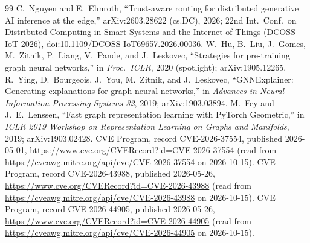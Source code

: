 \begin{thebibliography}{99}
 C.~Nguyen and E.~Elmroth, ``Trust-aware routing for distributed generative AI inference at the edge,'' arXiv:2603.28622 (cs.DC), 2026; 22nd Int.\ Conf.\ on Distributed Computing in Smart Systems and the Internet of Things (DCOSS-IoT 2026), doi:10.1109/DCOSS-IoT69657.2026.00036.
 W.~Hu, B.~Liu, J.~Gomes, M.~Zitnik, P.~Liang, V.~Pande, and J.~Leskovec, ``Strategies for pre-training graph neural networks,'' in \emph{Proc.\ ICLR}, 2020 (spotlight); arXiv:1905.12265.
 R.~Ying, D.~Bourgeois, J.~You, M.~Zitnik, and J.~Leskovec, ``GNNExplainer: Generating explanations for graph neural networks,'' in \emph{Advances in Neural Information Processing Systems 32}, 2019; arXiv:1903.03894.
 M.~Fey and J.~E.~Lenssen, ``Fast graph representation learning with PyTorch Geometric,'' in \emph{ICLR 2019 Workshop on Representation Learning on Graphs and Manifolds}, 2019; arXiv:1903.02428.
 CVE Program, record CVE-2026-37554, published 2026-05-01, \url{https://www.cve.org/CVERecord?id=CVE-2026-37554} (read from \url{https://cveawg.mitre.org/api/cve/CVE-2026-37554} on 2026-10-15).
 CVE Program, record CVE-2026-43988, published 2026-05-26, \url{https://www.cve.org/CVERecord?id=CVE-2026-43988} (read from \url{https://cveawg.mitre.org/api/cve/CVE-2026-43988} on 2026-10-15).
 CVE Program, record CVE-2026-44905, published 2026-05-26, \url{https://www.cve.org/CVERecord?id=CVE-2026-44905} (read from \url{https://cveawg.mitre.org/api/cve/CVE-2026-44905} on 2026-10-15).
\end{thebibliography}
